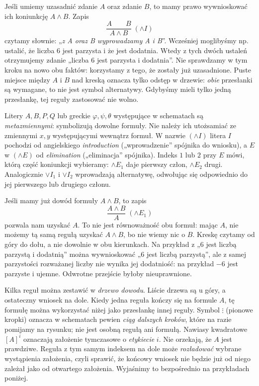\begin{przyklad}
Jeśli umiemy uzasadnić zdanie $A$ oraz zdanie $B$, to mamy prawo
wywnioskować ich koniunkcję $A\land B$. Zapis
\[
\frac{A\qquad B}{A\land B}\;(\land I)
\]
czytamy słownie: „\emph{z A oraz B wyprowadzamy A i B}”.
Wcześniej moglibyśmy np. ustalić, że liczba $6$ jest parzysta i że jest
dodatnia. Wtedy z tych dwóch ustaleń otrzymujemy zdanie
„liczba $6$ jest parzysta i dodatnia”. Nie sprawdzamy w tym kroku
na nowo obu faktów: korzystamy z tego, że zostały już uzasadnione.
Puste miejsce między $A$ i $B$ nad kreską oznacza tylko odstęp
w drzewie: \emph{obie} przesłanki są wymagane, to nie jest symbol
alternatywy. Gdybyśmy mieli tylko jedną przesłankę, tej reguły
zastosować nie wolno.
\end{przyklad}

\begin{uwaga}
Litery $A,B,P,Q$ lub greckie $\varphi,\psi,\theta$ występujące w schematach
są \emph{metazmiennymi}: symbolizują dowolne formuły.
Nie należy ich utożsamiać ze zmiennymi $x,y$ występującymi wewnątrz formuł.
W nazwie $(\land I)$ litera $I$ pochodzi od angielskiego
\emph{introduction} („wprowadzenie” spójnika do wniosku),
a $E$ w $(\land E)$ od \emph{elimination} („eliminacja” spójnika).
Indeks $1$ lub $2$ przy $E$ mówi, którą część koniunkcji wybieramy:
$\land E_1$ daje pierwszy człon, $\land E_2$ drugi.
Analogicznie $\lor I_1$ i $\lor I_2$ wprowadzają alternatywę,
odwołując się odpowiednio do jej pierwszego lub drugiego członu.
\end{uwaga}

\begin{przyklad}
Jeśli mamy już dowód formuły $A\land B$, to zapis
\[
\frac{A\land B}{A}\;(\land E_1)
\]
pozwala nam uzyskać $A$. To nie jest równoważność obu formuł:
mając $A$, nie możemy tą samą regułą uzyskać $A\land B$,
bo nie wiemy nic o $B$. Kreskę czytamy od góry do dołu,
a nie dowolnie w obu kierunkach. Na przykład z „$6$ jest liczbą
parzystą i dodatnią” można wywnioskować „$6$ jest liczbą parzystą”,
ale z samej parzystości rozważanej liczby nie wynika jej
dodatniość: na przykład $-6$ jest parzyste i ujemne.
Odwrotne przejście byłoby nieuprawnione.
\end{przyklad}

\begin{uwaga}
Kilka reguł można zestawić w \emph{drzewo dowodu}.
Liście drzewa są u góry, a ostateczny wniosek na dole.
Kiedy jedna reguła kończy się na formule $A$, tę formułę można
wykorzystać niżej jako przesłankę innej reguły.
Symbol $\vdots$ (pionowe kropki) oznacza w schematach
pewien \emph{ciąg dalszych kroków}, które na razie pomijamy na rysunku;
nie jest osobną regułą ani formułą.
Nawiasy kwadratowe $[A]^i$ oznaczają założenie tymczasowe
o \emph{etykiecie} $i$. Nie orzekają, że $A$ jest prawdziwe.
Reguła z tym samym indeksem na dole może \emph{rozładować}
wybrane wystąpienia założenia, czyli sprawić, że końcowy wniosek
nie będzie już od niego zależał jako od otwartego założenia.
Wyjaśnimy to bezpośrednio na przykładach poniżej.
\end{uwaga}


